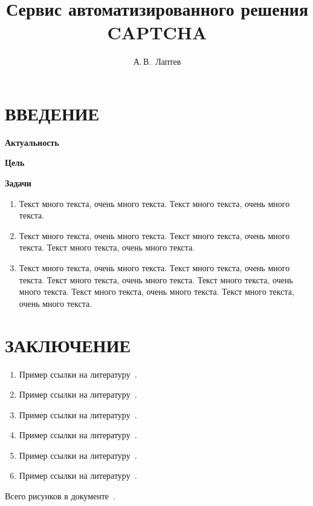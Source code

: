 \documentclass[14pt, oneside]{altsu-bachelor}
\title{Сервис автоматизированного решения CAPTCHA}
\author{А.\,В.~Лаптев}
\institute{Институт цифровых технологий, электроники и физики}
\date{\the\year}
\begin{document}
\maketitle

\setcounter{page}{2}
\makeabstract
\tableofcontents

\chapter*{ВВЕДЕНИЕ}

\textbf{Актуальность}

\textbf{Цель}

\textbf{Задачи}
\begin{enumerate}
\item Текст много текста, очень много текста. Текст много текста, очень много текста.
\item Текст много текста, очень много текста. Текст много текста, очень много текста. Текст много текста, очень много текста.
\item Текст много текста, очень много текста. Текст много текста, очень много текста. Текст много текста, очень много текста. Текст много текста, очень много текста. Текст много текста, очень много текста. Текст много текста, очень много текста.
\end{enumerate}

% 
% 
% 

\chapter*{ЗАКЛЮЧЕНИЕ}

\begin{enumerate}
\item Пример ссылки на литературу~\cite{bookexample}.
\item Пример ссылки на литературу~\cite{book1author}.
\item Пример ссылки на литературу~\cite{book5author}.
\item Пример ссылки на литературу~\cite{wikiRUBitbucket}.
\item Пример ссылки на литературу~\cite{wikiRUGitHub}.
\item Пример ссылки на литературу~\cite{wikiRUIdSoftware}.
\end{enumerate}

Всего рисунков в документе~\totalfigures.
\newpage
{}
\printbibliography[title={СПИСОК ИСПОЛЬЗОВАННОЙ ЛИТЕРАТУРЫ}]



\makelastpage
\end{document}
